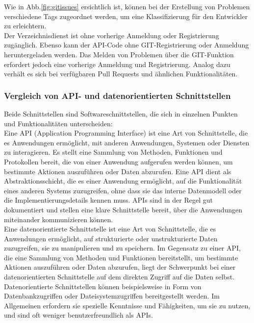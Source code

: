\documentclass[notitlepage, hidelinks]{article}
\begin{document}
Wie in Abb.\ref{fig:gitissues} ersichtlich ist, können bei der Erstellung von Problemen verschiedene Tags zugeordnet werden, um eine Klassifizierung für den Entwickler zu erleichtern. \\
Der Verzeichnisdienst ist ohne vorherige Anmeldung oder Registrierung zugänglich. Ebenso kann der API-Code ohne GIT-Registrierung oder Anmeldung heruntergeladen werden. Das Melden von Problemen über die GIT-Funktion erfordert jedoch eine vorherige Anmeldung und Registrierung. Analog dazu verhält es sich bei verfügbaren Pull Requests und ähnlichen Funktionalitäten.

\subsubsection{Vergleich von API- und datenorientierten Schnittstellen}
Beide Schnittstellen sind Softwareschnittstellen, die sich in einzelnen Punkten und Funktionalitäten unterscheiden: \\
Eine API (Application Programming Interface) ist eine Art von Schnittstelle, die es Anwendungen ermöglicht, mit anderen Anwendungen, Systemen oder Diensten zu interagieren. Es stellt eine Sammlung von Methoden, Funktionen und Protokollen bereit, die von einer Anwendung aufgerufen werden können, um bestimmte Aktionen auszuführen oder Daten abzurufen. Eine API dient als Abstraktionsschicht, die es einer Anwendung ermöglicht, auf die Funktionalität eines anderen Systems zuzugreifen, ohne dass sie das interne Datenmodell oder die Implementierungsdetails kennen muss. APIs sind in der Regel gut dokumentiert und stellen eine klare Schnittstelle bereit, über die Anwendungen miteinander kommunizieren können. \\
Eine datenorientierte Schnittstelle ist eine Art von Schnittstelle, die es Anwendungen ermöglicht, auf strukturierte oder unstrukturierte Daten zuzugreifen, sie zu manipulieren und zu speichern. Im Gegensatz zu einer API, die eine Sammlung von Methoden und Funktionen bereitstellt, um bestimmte Aktionen auszuführen oder Daten abzurufen, liegt der Schwerpunkt bei einer datenorientierten Schnittstelle auf dem direkten Zugriff auf die Daten selbst. Datenorientierte Schnittstellen können beispielsweise in Form von Datenbankzugriffen oder Dateisystemzugriffen bereitgestellt werden. Im Allgemeinen erfordern sie spezielle Kenntnisse und Fähigkeiten, um sie zu nutzen, und sind oft weniger benutzerfreundlich als APIs.
\end{document}
